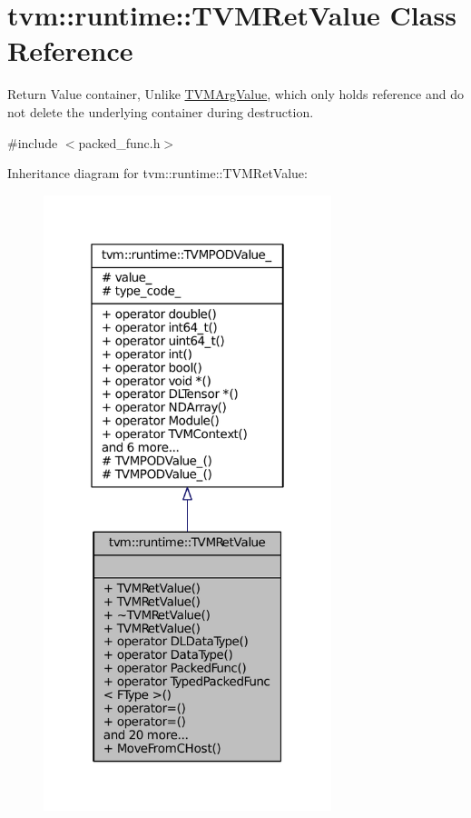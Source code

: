 \hypertarget{classtvm_1_1runtime_1_1TVMRetValue}{}\section{tvm\+:\+:runtime\+:\+:T\+V\+M\+Ret\+Value Class Reference}
\label{classtvm_1_1runtime_1_1TVMRetValue}


Return Value container, Unlike \hyperlink{classtvm_1_1runtime_1_1TVMArgValue}{T\+V\+M\+Arg\+Value}, which only holds reference and do not delete the underlying container during destruction.  




{\ttfamily \#include $<$packed\+\_\+func.\+h$>$}



Inheritance diagram for tvm\+:\+:runtime\+:\+:T\+V\+M\+Ret\+Value\+:
\nopagebreak
\begin{figure}[H]
\begin{center}
\leavevmode
\includegraphics[width=238pt]{classtvm_1_1runtime_1_1TVMRetValue__inherit__graph}
\end{center}
\end{figure}


